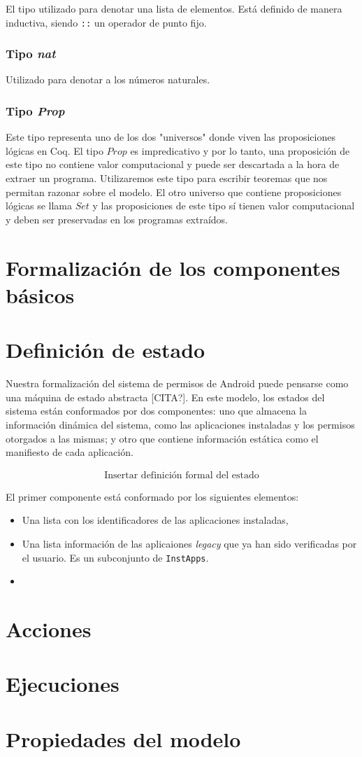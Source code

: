 El tipo utilizado para denotar una lista de elementos. Está definido de manera inductiva, siendo
\texttt{::} un operador de punto fijo. 

\subsubsection*{Tipo \textit{nat}}
Utilizado para denotar a los números naturales.

\subsubsection*{Tipo \textit{Prop}}

Este tipo representa uno de los dos "universos" donde viven las proposiciones lógicas en Coq. El tipo
$Prop$ es impredicativo y por lo tanto, una proposición de este tipo no contiene valor
computacional\cite{proof-irrelevance} y puede ser descartada a la hora de extraer un programa.
Utilizaremos este tipo para escribir teoremas que nos permitan razonar sobre el modelo. El otro
universo que contiene proposiciones lógicas se llama $Set$ y las proposiciones de este tipo sí tienen
valor computacional y deben ser preservadas en los programas extraídos.


\section{Formalización de los componentes básicos}


\section{Definición de estado}
Nuestra formalización del sistema de permisos de Android puede pensarse como una máquina de estado
abstracta [CITA?]. En este modelo, los estados del sistema están conformados por dos componentes: uno
que almacena la información dinámica del sistema, como las aplicaciones instaladas y los permisos otorgados
a las mismas; y otro que contiene información estática como el manifiesto de cada aplicación.

\begin{align}
    \text{Insertar definición formal del estado}
\end{align}

El primer componente está conformado por los siguientes elementos:

\begin{itemize}
    \item Una lista con los identificadores de las aplicaciones instaladas,
    \item Una lista  información de las aplicaiones \textit{legacy} que ya han
        sido verificadas por el usuario. Es un subconjunto de \texttt{InstApps}.
    \item \texttt{}
\end{itemize}


\section{Acciones}

\section{Ejecuciones}

\section{Propiedades del modelo}